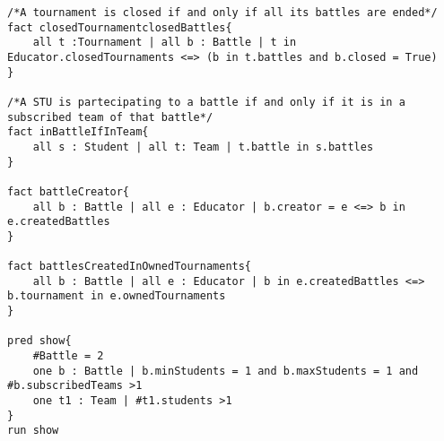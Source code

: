 \begin{lstlisting}[language=Alloy,  label={lst:alloycode}, basicstyle=\fontfamily{Roboto}\selectfont\ttfamily]
/*A tournament is closed if and only if all its battles are ended*/
fact closedTournamentclosedBattles{
	all t :Tournament | all b : Battle | t in Educator.closedTournaments <=> (b in t.battles and b.closed = True)
}

/*A STU is partecipating to a battle if and only if it is in a subscribed team of that battle*/
fact inBattleIfInTeam{
    all s : Student | all t: Team | t.battle in s.battles
}

fact battleCreator{
	all b : Battle | all e : Educator | b.creator = e <=> b in e.createdBattles
}

fact battlesCreatedInOwnedTournaments{
	all b : Battle | all e : Educator | b in e.createdBattles <=> b.tournament in e.ownedTournaments 
}

pred show{
	#Battle = 2
	one b : Battle | b.minStudents = 1 and b.maxStudents = 1 and #b.subscribedTeams >1
	one t1 : Team | #t1.students >1
}
run show
\end{lstlisting}